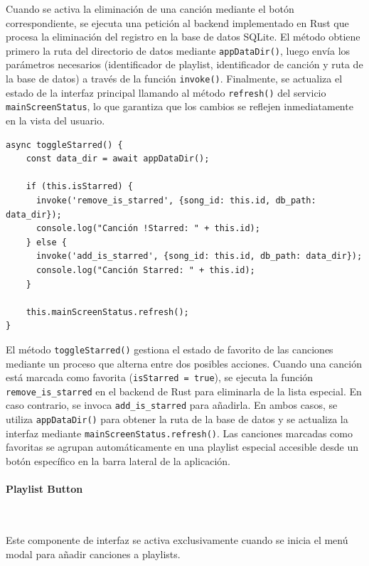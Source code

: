 \documentclass[11pt, a4paper]{article}
\begin{document}
                Cuando se activa la eliminación de una canción mediante el botón correspondiente, se ejecuta una petición al backend implementado en Rust que procesa la eliminación del registro en la base de datos SQLite. El método obtiene primero la ruta del directorio de datos mediante \texttt{appDataDir()}, luego envía los parámetros necesarios (identificador de playlist, identificador de canción y ruta de la base de datos) a través de la función \texttt{invoke()}. Finalmente, se actualiza el estado de la interfaz principal llamando al método \texttt{refresh()} del servicio \texttt{mainScreenStatus}, lo que garantiza que los cambios se reflejen inmediatamente en la vista del usuario.

                \begin{lstlisting}[caption={toggleStarred()}]
async toggleStarred() {
    const data_dir = await appDataDir();
    
    if (this.isStarred) {
      invoke('remove_is_starred', {song_id: this.id, db_path: data_dir});
      console.log("Canción !Starred: " + this.id);
    } else {
      invoke('add_is_starred', {song_id: this.id, db_path: data_dir});
      console.log("Canción Starred: " + this.id);
    }

    this.mainScreenStatus.refresh();
}
                \end{lstlisting}

                El método \texttt{toggleStarred()} gestiona el estado de favorito de las canciones mediante un proceso que alterna entre dos posibles acciones. Cuando una canción está marcada como favorita (\texttt{isStarred = true}), se ejecuta la función \texttt{remove\_is\_starred} en el backend de Rust para eliminarla de la lista especial. En caso contrario, se invoca \texttt{add\_is\_starred} para añadirla. En ambos casos, se utiliza \texttt{appDataDir()} para obtener la ruta de la base de datos y se actualiza la interfaz mediante \texttt{mainScreenStatus.refresh()}. Las canciones marcadas como favoritas se agrupan automáticamente en una playlist especial accesible desde un botón específico en la barra lateral de la aplicación.

                \paragraph{Playlist Button}
                ‎

                Este componente de interfaz se activa exclusivamente cuando se inicia el menú modal para añadir canciones a playlists.
\end{document}
